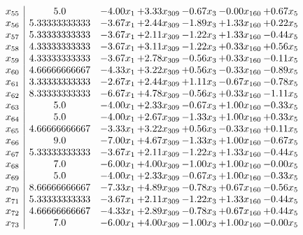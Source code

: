 \documentclass[8pt]{article}
\begin{document}
\[\begin{array}{c| c c@{\hskip 2pt} c@{\hskip 2pt} c@{\hskip 2pt} c@{\hskip 2pt} c@{\hskip 2pt} }
 x_{55}   &  5.0 & -4.00 x_{1} & +  3.33 x_{309} & -0.67 x_{3} & -0.00 x_{160} & +  0.67 x_{5}\\
 x_{56}   &  5.33333333333 & -3.67 x_{1} & +  2.44 x_{309} & -1.89 x_{3} & +  1.33 x_{160} & +  0.22 x_{5}\\
 x_{57}   &  5.33333333333 & -3.67 x_{1} & +  2.11 x_{309} & -1.22 x_{3} & +  1.33 x_{160} & -0.44 x_{5}\\
 x_{58}   &  4.33333333333 & -3.67 x_{1} & +  3.11 x_{309} & -1.22 x_{3} & +  0.33 x_{160} & +  0.56 x_{5}\\
 x_{59}   &  4.33333333333 & -3.67 x_{1} & +  2.78 x_{309} & -0.56 x_{3} & +  0.33 x_{160} & -0.11 x_{5}\\
 x_{60}   &  4.66666666667 & -4.33 x_{1} & +  3.22 x_{309} & +  0.56 x_{3} & -0.33 x_{160} & -0.89 x_{5}\\
 x_{61}   &  3.33333333333 & -2.67 x_{1} & +  2.44 x_{309} & +  1.11 x_{3} & -0.67 x_{160} & -0.78 x_{5}\\
 x_{62}   &  8.33333333333 & -6.67 x_{1} & +  4.78 x_{309} & -0.56 x_{3} & +  0.33 x_{160} & -1.11 x_{5}\\
 x_{63}   &  5.0 & -4.00 x_{1} & +  2.33 x_{309} & -0.67 x_{3} & +  1.00 x_{160} & -0.33 x_{5}\\
 x_{64}   &  5.0 & -4.00 x_{1} & +  2.67 x_{309} & -1.33 x_{3} & +  1.00 x_{160} & +  0.33 x_{5}\\
 x_{65}   &  4.66666666667 & -3.33 x_{1} & +  3.22 x_{309} & +  0.56 x_{3} & -0.33 x_{160} & +  0.11 x_{5}\\
 x_{66}   &  9.0 & -7.00 x_{1} & +  4.67 x_{309} & -1.33 x_{3} & +  1.00 x_{160} & -0.67 x_{5}\\
 x_{67}   &  5.33333333333 & -3.67 x_{1} & +  2.11 x_{309} & -1.22 x_{3} & +  1.33 x_{160} & -0.44 x_{5}\\
 x_{68}   &  7.0 & -6.00 x_{1} & +  4.00 x_{309} & -1.00 x_{3} & +  1.00 x_{160} & -0.00 x_{5}\\
 x_{69}   &  5.0 & -4.00 x_{1} & +  2.33 x_{309} & -0.67 x_{3} & +  1.00 x_{160} & -0.33 x_{5}\\
 x_{70}   &  8.66666666667 & -7.33 x_{1} & +  4.89 x_{309} & -0.78 x_{3} & +  0.67 x_{160} & -0.56 x_{5}\\
 x_{71}   &  5.33333333333 & -3.67 x_{1} & +  2.11 x_{309} & -1.22 x_{3} & +  1.33 x_{160} & -0.44 x_{5}\\
 x_{72}   &  4.66666666667 & -4.33 x_{1} & +  2.89 x_{309} & -0.78 x_{3} & +  0.67 x_{160} & +  0.44 x_{5}\\
 x_{73}   &  7.0 & -6.00 x_{1} & +  4.00 x_{309} & -1.00 x_{3} & +  1.00 x_{160} & -0.00 x_{5}\\

\end{array}\]
\end{document}
